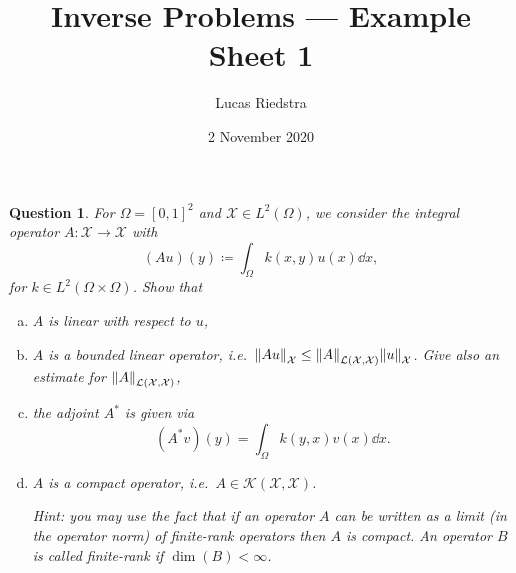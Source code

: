 \documentclass{article}
\title{Inverse Problems --- Example Sheet 1} %
\author{Lucas Riedstra}
\date{2 November 2020} %
\theoremstyle{plain}
\newtheorem{question}{Question}
\theoremstyle{remark}
\newcommand{\Cal}{\mathcal}
\newcommand\ceq\coloneqq %
\newcommand\XX{\Cal X}
\newcommand\LL{\Cal L}
\newcommand\KK{\Cal K}
\begin{document}
\maketitle

\begin{question}
	For $\Omega = [0, 1]^2$ and $\XX \in L^2(\Omega)$, we consider the integral operator $A \colon \XX \to \XX$ with
	\[
	(Au)(y) \ceq \int_\Omega k(x, y) u(x) \dd{x},
	\]
	for $k \in L^2(\Omega \times \Omega)$.  Show that
	\begin{enumerate}[(a)]
		\item $A$ is linear with respect to $u$,
		\item $A$ is a bounded linear operator, i.e.\ $\norm{Au}_\XX \leq \norm{A}_{\LL(\XX, \XX)} \norm{u}_\XX$. Give also an estimate for $\norm{A}_{\LL(\XX, \XX)}$,
		\item the adjoint $A^*$ is given via
		\[
		(A^* v)(y) = \int_\Omega k(y, x) v(x) \dd{x}.
		\]
		\item $A$ is a compact operator, i.e.\ $A \in \KK(\XX, \XX)$. 
		
		\emph{Hint:} you may use the fact that if an operator $A$ can be written as a limit (in the operator norm) of finite-rank operators then $A$ is compact. An operator $B$ is called finite-rank if $\dim(B) < \infty$. 
	\end{enumerate}
\end{question}
\end{document}

